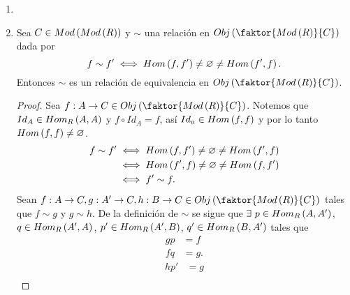 \documentclass{article}
\begin{document}
\begin{enumerate}[label=\textbf{Ej \arabic*.}]
\begin{proof}
			$\boxed{\text{(d)}}$ Este resultado se concluye de los anteriores. En efecto,
			\begin{align*}
				\overline{\varepsilon}_{X,M}\ es\ un\ isomorfismo & \Leftrightarrow\overline{\varepsilon}_{X,M}\ es\ un\ epimorfismo\ y\ monomorfismo\\
				& \Leftrightarrow M=im\lrprth{\overline{\varepsilon}_{X,M}}\ y\ X\ es\ R-l.i.\\
				& \Leftrightarrow X\ es\ una\ R-base.
			\end{align*}
		\end{proof}
		\item 
		\item Sea $C\in Mod\left(Mod\left(R\right)\right)$ y $\sim$ una relación en $Obj\lrprth{\faktor{Mod\lrprth{R}}{C}}$ dada por
		\begin{equation*}
			f\sim f'\iff Hom\left(f,f'\right)\neq\varnothing\neq Hom\left(f',f\right).
		\end{equation*}
		Entonces $\sim$ es un relación de equivalencia en $Obj\lrprth{\faktor{Mod\lrprth{R}}{C}}$.
		\begin{proof}
			 Sea $f:A\to C\in Obj\lrprth{\faktor{Mod\lrprth{R}}{C}}$. Notemos que $Id_A\in Hom_{R}\left(A,A\right)$ y $f\circ Id_A=f$, así $Id_a\in Hom\left(f,f\right)$ y por lo tanto $Hom\left(f,f\right)\neq\varnothing$.\\
			\begin{align*}
				f\sim f'&\iff  Hom\left(f,f'\right)\neq\varnothing\neq Hom\left(f',f\right)\\
				&\iff  Hom\left(f',f\right)\neq\varnothing\neq Hom\left(f,f'\right)\\
				&\iff f'\sim f.
			\end{align*}
			 Sean $f:A\to C,g:A'\to C, h:B\to C\in Obj\lrprth{\faktor{Mod\lrprth{R}}{C}}$ tales que $f\sim g$ y $g\sim h$. De la definición de $\sim$ se sigue que $\exists\ p\in\ringmodhom{R}{A}{A'}$, $q\in Hom_{R}\left(A',A\right)$, $p'\in Hom_{R}\left(A',B\right)$, $q'\in Hom_{R}\left(B,A'\right)$ tales que
			\begin{equation*}\label{fsimg}\tag{*}
				\begin{split}
					gp&=f\\
					fq&=g.
				\end{split}
			\end{equation*}
			\begin{equation*}\label{gsimh}\tag{**}
			\begin{split}
				hp'&=g\\

\end{split}
\end{equation*}
\end{proof}
\end{enumerate}
\end{document}
